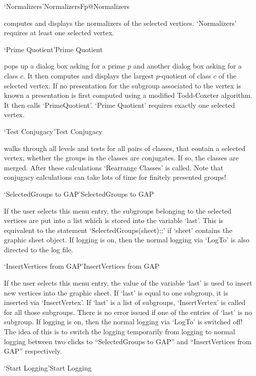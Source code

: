 \>`Normalizers'{NormalizersFp}@{Normalizers}

computes and displays the normalizers of the selected vertices.
`Normalizers' requires at least one selected vertex.

\>`Prime Quotient'{Prime Quotient}

pops up a dialog box asking for a prime $p$ and another dialog box asking
for a class $c$.  It then  computes and displays the largest $p$-quotient
of class $c$ of the selected vertex.  If no presentation for the subgroup
associated to the vertex is known a  presentation is first computed using
a   modified  Todd-Coxeter algorithm.   It    then calls `PrimeQuotient'.
`Prime Quotient' requires exactly one selected vertex.

\>`Test Conjugacy'{Test Conjugacy}

walks through all levels and tests for all pairs of classes, that contain a 
selected vertex, whether the groups in the classes are conjugates. If so,
the classes are merged. After these calculations `Rearrange Classes' is
called. Note that conjugacy calculations can take lots of time for finitely 
presented groups!

\>`SelectedGroups to GAP'{SelectedGroups to GAP}

If  the  user  selects  this menu entry,  the  subgroups   belonging to the
selected  vertices are put into a  list which  is  stored into the variable
`last'.  This is equivalent  to the  statement `SelectedGroups(sheet);;' if
`sheet' contains the graphic sheet  object. If {\XGAP}  logging is on, then
the normal {\GAP} logging via `LogTo'  is also directed  to the {\XGAP} log
file.

\>`InsertVertices from GAP'{InsertVertices from GAP}

If the user selects this  menu entry, the  value of the variable `last'  is
used to insert new vertices into the graphic sheet.  If  `last' is equal to
one subgroup, it  is inserted via  `InsertVertex'. If `last'  is a list  of
subgroups, `InsertVertex' is  called for all  those subgroups. There is  no
error  issued if one of  the entries of `last'   is no subgroup. If {\XGAP}
logging is on, then the normal {\GAP} logging via `LogTo'  is switched off! 
The idea of this is to switch  the logging temporarily from {\XGAP} logging
to normal  {\GAP} logging between two clicks  to  ``SelectedGroups to GAP''
and ``InsertVertices from GAP'' respectively.

\>`Start Logging'{Start Logging}

